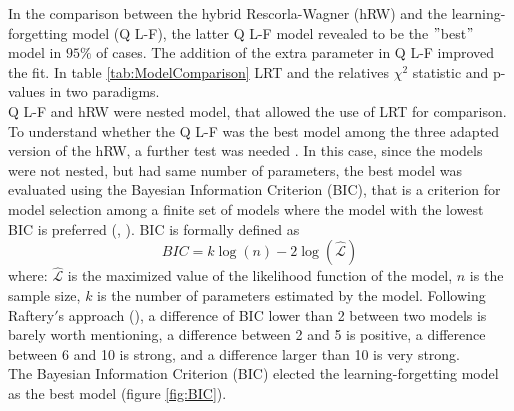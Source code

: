 In the comparison between the hybrid Rescorla-Wagner (hRW) and the learning-forgetting model (Q L-F), the latter Q L-F model revealed to be the $"$best$"$ model in $95\%$ of cases. The addition of the extra parameter in Q L-F improved the fit. In table \ref{tab:ModelComparison} LRT and the relatives $\chi^2$ statistic and p-values in two paradigms.\\
Q L-F and hRW were nested model, that allowed the use of LRT for comparison. To understand whether the Q L-F was the best model among the three adapted version of the hRW, a further test was needed . In this case, since the models were not nested, but had same number of parameters, the best model was evaluated using the Bayesian Information Criterion (BIC), that is a criterion for model selection among a finite set of models where the model with the lowest BIC is preferred (\cite{Schwarz}, \cite{NeathCavanaugh}). BIC is formally defined as 
\begin{equation*}
    BIC=k\log(n)-2\log(\hat{\mathcal{L}})
\end{equation*}
where: ${\hat{\mathcal{L}}}$ is the maximized value of the likelihood function of the model, $n$ is the sample size, $k$ is the number of parameters estimated by the model. Following Raftery$'$s approach (\cite{Raftery}), a difference of BIC lower than 2 between two models is barely worth mentioning, a difference between 2 and 5 is positive, a difference between 6 and 10 is strong, and a difference larger than 10 is very strong.\\The Bayesian Information Criterion (BIC) elected the learning-forgetting model as the best model (figure \ref{fig:BIC}).
